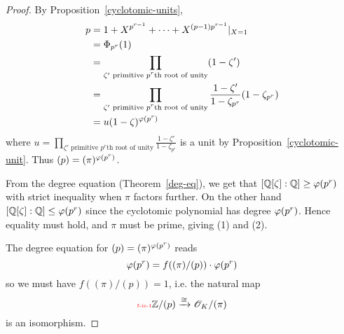 \begin{proof}
By Proposition~\ref{cyclotomic-units},
\begin{align*}
p&=1+X^{p^{r-1}}+\cdots +X^{(p-1)p^{r-1}}|_{X=1}\\
&=\Phi_{p^r}(1)\\
&=\prod_{\zeta' \text{ primitive $p^r$th root of unity}}(1-\zeta')\\
&=\prod_{\zeta' \text{ primitive $p^r$th root of unity}}\frac{1-\zeta'}{1-\zeta_{p^r}}(1-\zeta_{p^r})\\
&=u(1-\zeta)^{\varphi(p^r)}
\end{align*}
where $u=\prod_{\zeta' \text{ primitive $p^r$th root of unity}}\frac{1-\zeta'}{1-\zeta_{p^r}}$ is a unit by Proposition~\ref{cyclotomic-unit}. Thus $(p)=(\pi)^{\varphi(p^r)}$.

From the degree equation (Theorem~\ref{deg-eq}), we get that $[\mathbb{Q}[\zeta]:\mathbb{Q}]\ge \varphi(p^r)$ with strict inequality when $\pi$ factors further. On the other hand $[\mathbb{Q}[\zeta]:\mathbb{Q}]\le \varphi(p^r)$ since the cyclotomic polynomial has degree $\varphi(p^r)$. Hence equality must hold, and $\pi$ must be prime, giving (1) and (2).

The degree equation for $(p)=(\pi)^{\varphi(p^r)}$ reads
\[
\varphi(p^r)=f((\pi)/(p))\cdot \varphi(p^r)
\]
so we must have $f((\pi)/(p))=1$, i.e. the natural map \begin{equation}\llabel{f-is-1}
\Z/(p)\xra{\cong} \sO_K/(\pi)
\end{equation}
is an isomorphism.


\end{proof}
